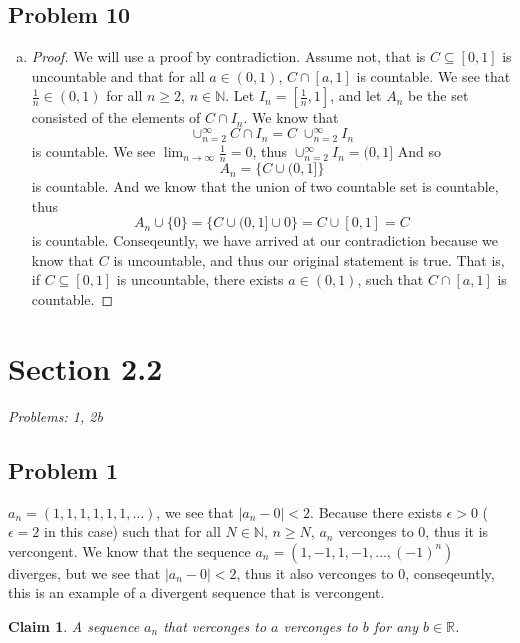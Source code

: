 \documentclass[12pt]{article}
\newtheorem*{claim}{Claim}
\begin{document}
\subsection*{Problem 10}
\begin{enumerate}[a).]
    \item {
        \begin{proof}
            We will use a proof by contradiction. 
            Assume not, that is $C \subseteq [0,1]$ is uncountable and that for all $a \in (0,1)$, $C \cap [a,1]$ is countable. 
            We see that $\frac{1}{n} \in (0,1)$ for all $n \ge 2$, $n \in \mathbb{N}$. 
            Let $I_n = [\frac{1}{n},1]$, and let $A_n$ be the set consisted of the elements of $C\cap I_n$. 
            We know that $$\cup^{\infty}_{n = 2}C \cap I_n = C\; \cup^{\infty}_{n = 2}I_n$$ is countable.
            We see $\lim_{n \rightarrow \infty} \frac{1}{n} = 0$, thus $\cup^{\infty}_{n = 2} I_n= (0,1]$
            And so $$A_n = \{C\cup (0,1]\}$$ is countable.
            And we know that the union of two countable set is countable, thus $$A_n\cup{\{0\}} = \{C\cup (0,1] \cup{0}\} = {C \cup [0,1] = C}$$ is countable.
            Conseqeuntly, we have arrived at our contradiction because we know that $C$ is uncountable, and thus our original statement is true. 
            That is, if $C \subseteq [0,1]$ is uncountable, there exists $a \in (0,1)$, such that $C \cap[a,1]$ is countable.
        \end{proof}

    }
\end{enumerate}



\vspace*{1cm}


\section*{Section 2.2}
\textit{Problems: 1, 2b}
\subsection*{Problem 1}
$a_n = (1,1,1,1,1,1, \dots)$, we see that $|a_n - 0| < 2$.
Because there exists $\epsilon > 0$ ($\epsilon = 2$ in this case) such that for all $N \in \mathbb{N}$, $n \ge N$,  $a_n$ verconges to $0$, thus it is vercongent. 
We know that the sequence $a_n = (1,-1,1,-1, \dots, (-1)^{n})$ diverges, but we see that $|a_n - 0| < 2$, thus it also verconges to 0, conseqeuntly, this is an example of a divergent sequence that is vercongent. 
\begin{claim}
    A sequence $a_n$ that verconges to $a$ verconges to $b$ for any $b \in \mathbb{R}$. 
\end{claim}
\end{document}
